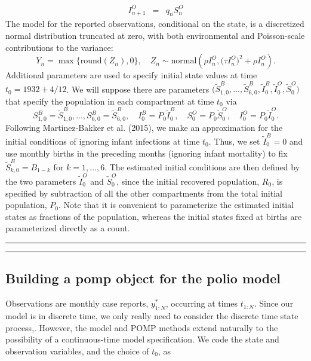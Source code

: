 \documentclass[]{article}
\begin{document}
\begin{itemize}
\[\begin{array}{rcl}
  I^O_{n+1}&=& q_n S^O_n
  \end{array}\] The model for the reported observations, conditional on
  the state, is a discretized normal distribution truncated at zero,
  with both environmental and Poisson-scale contributions to the
  variance:
  \[Y_n= \max\{\mathrm{round}(Z_n),0\}, \quad Z_n\sim\mathrm{normal}\left(\rho I^O_n, \big(\tau  I^O_n\big)^2 + \rho I^O_n\right).\]
  Additional parameters are used to specify initial state values at time
  \(t_0=1932+ 4/12\). We will suppose there are parameters
  \(\big(\tilde S^B_{1,0},...,\tilde S^B_{6,0}, \tilde I^B_0,\tilde I^O_0,\tilde S^O_0\big)\)
  that specify the population in each compartment at time \(t_0\) via
  \[ S^B_{1,0}= {\tilde S}^B_{1,0} ,...,S^B_{6,0}= \tilde S^B_{6,0}, \quad I^B_{0}= P_0 \tilde I^B_{0},\quad S^O_{0}= P_0 \tilde S^O_{0}, \quad I^O_{0}= P_0 \tilde I^O_{0}.\]
  Following Martinez-Bakker et al. (2015), we make an approximation for
  the initial conditions of ignoring infant infections at time \(t_0\).
  Thus, we set \(\tilde I^B_{0}=0\) and use monthly births in the
  preceding months (ignoring infant mortality) to fix
  \(\tilde S^B_{k,0}=B_{1-k}\) for \(k=1,\dots,6\). The estimated
  initial conditions are then defined by the two parameters
  \(\tilde I^O_{0}\) and \(\tilde S^O_{0}\), since the initial recovered
  population, \(R_0\), is specified by subtraction of all the other
  compartments from the total initial population, \(P_0\). Note that it
  is convenient to parameterize the estimated initial states as
  fractions of the population, whereas the initial states fixed at
  births are parameterized directly as a count.
\end{itemize}

\begin{center}\rule{0.5\linewidth}{\linethickness}\end{center}

\begin{center}\rule{0.5\linewidth}{\linethickness}\end{center}

\subsection{Building a pomp object for the polio
model}\label{building-a-pomp-object-for-the-polio-model}

Observations are monthly case reports, \(y^*_{1:N}\), occurring at times
\(t_{1:N}\). Since our model is in discrete time, we only really need to
consider the discrete time state process,. However, the model and POMP
methods extend naturally to the possibility of a continuous-time model
specification. We code the state and observation variables, and the
choice of \(t_0\), as
\end{document}
